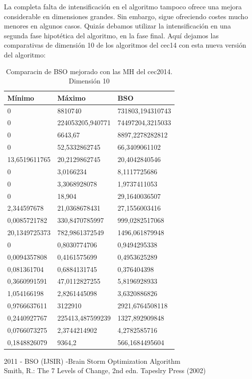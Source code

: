La completa falta de intensificación en el algoritmo tampoco ofrece una mejora considerable en dimensiones grandes. Sin embargo, sigue ofreciendo costes mucho menores en algunos casos. Quizás debamos utilizar la intensificación en una segunda fase hipotética del algoritmo, en la fase final. Aquí dejamos las comparativas de dimensión 10 de los algoritmos del cec14 con esta nueva versión del algoritmo:\\

\newpage

\begin{table}[htbp]
	\begin{center}
		\begin{tabular}{|l|l|l|}
			\hline
			Mínimo & Máximo & BSO \\
			\hline \hline
			0 & 8810740 & 731803,194310743 \\ \hline
			0 & 224053205,940771 & 74497204,3215033 \\ \hline
			0 & 6643,67 & 8897,2278282812 \\ \hline
			0 & 52,5332862745 & 66,3409061102 \\ \hline
			13,6519611765 & 20,2129862745 & 20,4042840546\\ \hline
			0 & 3,0166234 & 8,1117725686\\ \hline
			0 & 3,3068928078 & 1,9737411053\\ \hline
			0 & 18,904 & 29,1640036507\\ \hline
			2,344597678 & 21,0368678431 & 27,1556003416\\ \hline
			0,0085721782 & 330,8470785997 & 999,0282517068\\ \hline
			20,1349725373 & 782,9861372549 & 1496,061879948\\ \hline
			0 & 0,8030774706 & 0,9494295338\\ \hline
			0,0094357808 & 0,4161575699 & 0,4953625289\\ \hline
			0,081361704 & 0,6884131745 & 0,376404398\\ \hline
			0,3660991591 & 47,0112827255 & 5,8196928933\\ \hline
			1,054166198 & 2,8261445098 & 3,6320886826\\ \hline
			0,9766637611 & 3122910 & 2921,6764508118\\ \hline
			0,2440927767 & 225413,487599239 & 1327,892909848\\ \hline
			0,0766073275 & 2,3744214902 & 4,2782585716\\ \hline
			0,1848826079 & 9364,2 & 566,1684495604\\ \hline
			
			
		\end{tabular}
		\caption{Comparacin de BSO mejorado con las MH del cec2014. Dimensión 10}
		\label{tabla:Dimension10MejoradaComparativa}
	\end{center}
\end{table}

\newpage


\begin{thebibliography}{9}
	 2011 - BSO (IJSIR) -Brain Storm Optimization Algorithm\\
	
	 Smith, R.: The 7 Levels of Change, 2nd edn. Tapeslry Press (2002)\\
	
\end{thebibliography}








